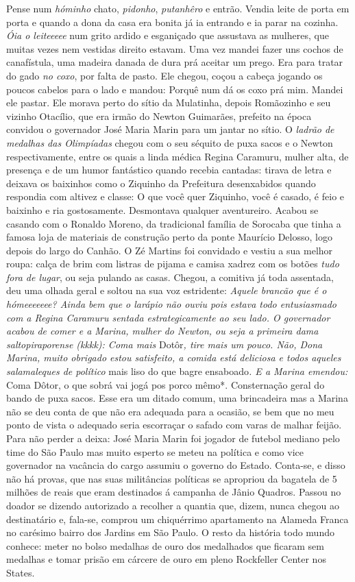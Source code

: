 \documentclass[12pt,brazil,]{book}
\begin{document}
Pense num \emph{hóminho} chato, \emph{pidonho}, \emph{putanhêro} e
entrão. Vendia leite de porta em porta e quando a dona da casa era
bonita já ia entrando e ia parar na cozinha. \emph{Óia o leiteeeee} num
grito ardido e esganiçado que assustava as mulheres, que muitas vezes
nem vestidas direito estavam. Uma vez mandei fazer uns cochos de
canafístula, uma madeira danada de dura prá aceitar um prego. Era para
tratar do gado \emph{no coxo}, por falta de pasto. Ele chegou, coçou a
cabeça jogando os poucos cabelos para o lado e mandou: Porquê num dá os
coxo prá mim. Mandei ele pastar. Ele morava perto do sítio da Mulatinha,
depois Romãozinho e seu vizinho Otacílio, que era irmão do Newton
Guimarães, prefeito na época convidou o governador José Maria Marin para
um jantar no sítio. O \emph{ladrão de medalhas das Olimpíadas} chegou
com o seu séquito de puxa sacos e o Newton respectivamente, entre os
quais a linda médica Regina Caramuru, mulher alta, de presença e de um
humor fantástico quando recebia cantadas: tirava de letra e deixava os
baixinhos como o Ziquinho da Prefeitura desenxabidos quando respondia
com altivez e classe: O que você quer Ziquinho, você é casado, é feio e
baixinho e ria gostosamente. Desmontava qualquer aventureiro. Acabou se
casando com o Ronaldo Moreno, da tradicional família de Sorocaba que
tinha a famosa loja de materiais de construção perto da ponte Maurício
Delosso, logo depois do largo do Canhão. O Zé Martins foi convidado e
vestiu a sua melhor roupa: calça de brim com listras de pijama e camisa
xadrez com os botões \emph{tudo fora de lugar}, ou seja pulando as
casas. Chegou, a comitiva já toda assentada, deu uma olhada geral e
soltou na sua voz estridente: \emph{Aquele brancão que é o hómeeeeeee?
Ainda bem que o larápio não ouviu pois estava todo entusiasmado com a
Regina Caramuru sentada estrategicamente ao seu lado. O governador
acabou de comer e a Marina, mulher do Newton, ou seja a primeira dama
saltopiraporense (kkkk): Coma mais }Dotôr\emph{, tire mais um pouco.
Não, Dona Marina, muito obrigado estou satisfeito, a comida está
deliciosa e todos aqueles salamaleques de político }mais liso do que
bagre ensaboado\emph{. E a Marina emendou: }Coma Dôtor, o que sobrá vai
jogá pos porco mêmo*. Consternação geral do bando de puxa sacos. Esse
era um ditado comum, uma brincadeira mas a Marina não se deu conta de
que não era adequada para a ocasião, se bem que no meu ponto de vista o
adequado seria escorraçar o safado com varas de malhar feijão. Para não
perder a deixa: José Maria Marin foi jogador de futebol mediano pelo
time do São Paulo mas muito esperto se meteu na política e como vice
governador na vacância do cargo assumiu o governo do Estado. Conta-se, e
disso não há provas, que nas suas militâncias políticas se apropriou da
bagatela de 5 milhões de reais que eram destinados á campanha de Jânio
Quadros. Passou no doador se dizendo autorizado a recolher a quantia
que, dizem, nunca chegou ao destinatário e, fala-se, comprou um
chiquérrimo apartamento na Alameda Franca no carésimo bairro dos Jardins
em São Paulo. O resto da história todo mundo conhece: meter no bolso
medalhas de ouro dos medalhados que ficaram sem medalhas e tomar prisão
em cárcere de ouro em pleno Rockfeller Center nos States.
\end{document}
